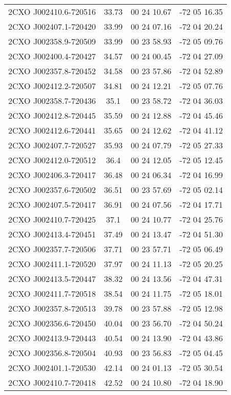 \begin{table}
\begin{tabular}{cccc}
2CXO J002410.6-720516 & 33.73 & 00 24 10.67 & -72 05 16.35 \\
2CXO J002407.1-720420 & 33.99 & 00 24 07.16 & -72 04 20.24 \\
2CXO J002358.9-720509 & 33.99 & 00 23 58.93 & -72 05 09.76 \\
2CXO J002400.4-720427 & 34.57 & 00 24 00.45 & -72 04 27.09 \\
2CXO J002357.8-720452 & 34.58 & 00 23 57.86 & -72 04 52.89 \\
2CXO J002412.2-720507 & 34.81 & 00 24 12.21 & -72 05 07.76 \\
2CXO J002358.7-720436 & 35.1 & 00 23 58.72 & -72 04 36.03 \\
2CXO J002412.8-720445 & 35.59 & 00 24 12.88 & -72 04 45.46 \\
2CXO J002412.6-720441 & 35.65 & 00 24 12.62 & -72 04 41.12 \\
2CXO J002407.7-720527 & 35.93 & 00 24 07.79 & -72 05 27.33 \\
2CXO J002412.0-720512 & 36.4 & 00 24 12.05 & -72 05 12.45 \\
2CXO J002406.3-720417 & 36.48 & 00 24 06.34 & -72 04 16.99 \\
2CXO J002357.6-720502 & 36.51 & 00 23 57.69 & -72 05 02.14 \\
2CXO J002407.5-720417 & 36.91 & 00 24 07.56 & -72 04 17.71 \\
2CXO J002410.7-720425 & 37.1 & 00 24 10.77 & -72 04 25.76 \\
2CXO J002413.4-720451 & 37.49 & 00 24 13.47 & -72 04 51.30 \\
2CXO J002357.7-720506 & 37.71 & 00 23 57.71 & -72 05 06.49 \\
2CXO J002411.1-720520 & 37.97 & 00 24 11.13 & -72 05 20.25 \\
2CXO J002413.5-720447 & 38.32 & 00 24 13.56 & -72 04 47.31 \\
2CXO J002411.7-720518 & 38.54 & 00 24 11.75 & -72 05 18.01 \\
2CXO J002357.8-720513 & 39.78 & 00 23 57.88 & -72 05 12.98 \\
2CXO J002356.6-720450 & 40.04 & 00 23 56.70 & -72 04 50.24 \\
2CXO J002413.9-720443 & 40.54 & 00 24 13.90 & -72 04 43.86 \\
2CXO J002356.8-720504 & 40.93 & 00 23 56.83 & -72 05 04.45 \\
2CXO J002401.1-720530 & 42.14 & 00 24 01.13 & -72 05 30.54 \\
2CXO J002410.7-720418 & 42.52 & 00 24 10.80 & -72 04 18.90 \\

\end{tabular}
\end{table}
